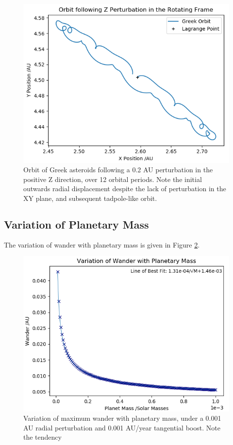 \documentclass[11pt, a4paper,twocolumn]{article} %
\begin{document}
\begin{figure}
	\centering
	\includegraphics[width=0.8\linewidth]{Figures/z_perturb_orbit}
	\caption{Orbit of Greek asteroids following a 0.2 AU perturbation in the positive Z direction, over 12 orbital periods. Note the initial outwards radial displacement despite the lack of perturbation in the XY plane, and subsequent tadpole-like orbit.}
	\label{fig:zorbit}
\end{figure}

\subsection{Variation of Planetary Mass} \label{planet}
The variation of wander with planetary mass is given in Figure \ref{fig:planetmass}.

\begin{figure}
	\centering
	\includegraphics[width=0.8\linewidth]{Figures/wanderwithplanetmass_q7}
	\caption{Variation of maximum wander with planetary mass, under a 0.001 AU radial perturbation and 0.001 AU/year tangential boost. Note the tendency }
	\label{fig:planetmass}
\end{figure}
\end{document}
